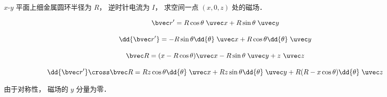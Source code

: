 
\begin{issues}
\issueDraft
\end{issues}


$x$-$y$ 平面上细金属圆环半径为 $R$， 逆时针电流为 $I$， 求空间一点 $(x, 0, z)$ 处的磁场．

\begin{equation}
\bvec r' = R\cos\theta\; \uvec x + R\sin\theta\; \uvec y
\end{equation}

\begin{equation}
\dd{\bvec r'} = -R\sin \theta \dd{\theta}\; \uvec x + R\cos \theta \dd{\theta}\; \uvec y
\end{equation}

\begin{equation}
\bvec R = (x - R\cos\theta)\uvec x -R\sin\theta \;\uvec y+ z\ \uvec z
\end{equation}

\begin{equation}
\dd{\bvec r'} \cross \bvec R = Rz \cos\theta \dd{\theta} \;\uvec x + Rz\sin\theta \dd{\theta} \;\uvec y + R(R - x\cos\theta)\dd{\theta}\;\uvec z
\end{equation}

由于对称性， 磁场的 $y$ 分量为零．
